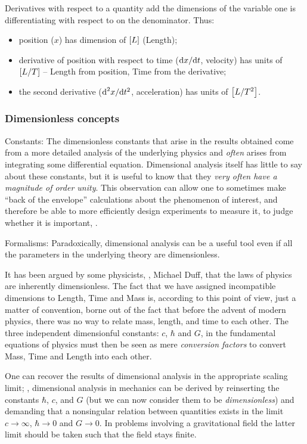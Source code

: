 Derivatives with respect to a quantity add the dimensions of the variable one is differentiating with respect to on the denominator. Thus:
\begin{itemize}
\item position ($x$) has dimension of $\left[{L}\right]$ (Length);
\item derivative of position with respect to time ($\text{d} x/\text{d} t$, velocity) has units of $\left[{L/T}\right]$ -- Length from position, Time from the derivative;
\item the second derivative ($\text{d}^2 x/\text{d} t^2$, acceleration) has units of $\left[{L/T^2}\right]$.
\end{itemize}


\subsubsection{Dimensionless concepts}
Constants: The dimensionless constants that arise in the results obtained come from a more detailed analysis of the underlying physics and \emph{often} arises from integrating some differential equation. Dimensional analysis itself has little to say about these constants, but it is useful to know that they \emph{very often have a magnitude of order unity}. This observation can allow one to sometimes make ``back of the envelope'' calculations about the phenomenon of interest, and therefore be able to more efficiently design experiments to measure it, to judge whether it is important, \etc.

Formalisms: Paradoxically, dimensional analysis can be a useful tool even if all the parameters in the underlying theory are dimensionless.

It has been argued by some physicists, \eg, Michael Duff, that the laws of physics are inherently dimensionless. The fact that we have assigned incompatible dimensions to Length, Time and Mass is, according to this point of view, just a matter of convention, borne out of the fact that before the advent of modern physics, there was no way to relate mass, length, and time to each other. The three independent dimensionful constants: $c$, $\hbar$ and $G$, in the fundamental equations of physics must then be seen as mere \emph{conversion factors} to convert Mass, Time and Length into each other.

One can recover the results of dimensional analysis in the appropriate scaling limit; \eg, dimensional analysis in mechanics can be derived by reinserting the constants $\hbar$, $c$, and $G$ (but we can now consider them to be \emph{dimensionless}) and demanding that a nonsingular relation between quantities exists in the limit $c\to\infty$, $\hbar\to 0$ and $G\to 0$. In problems involving a gravitational field the latter limit should be taken such that the field stays finite.


